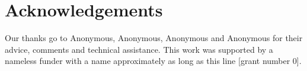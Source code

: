 \documentclass[10pt, times, conference, letterpaper]{IEEEtran}
\begin{document}
\section*{Acknowledgements}
Our thanks go to Anonymous, Anonymous, Anonymous and Anonymous for their advice, comments and technical assistance.
This work was supported by a nameless funder with a name approximately as long as this line [grant number 0].

\renewcommand*{\bibfont}{\footnotesize}
\printbibliography
\end{document}
